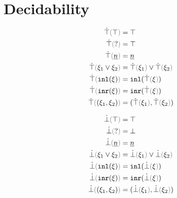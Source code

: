 \section{Decidability}

\judgboxa{\ctruify{\hxi} = \xi}{}
\begin{subequations}\label{defn:truify}
\begin{align}
  \ctruify{\ctruth} &= \ctruth \\
  \ctruify{\cunknown} &= \ctruth \\
  \ctruify{\cnum{n}} &= \cnum{n} \\
  \ctruify{\cor{\xi_1}{\xi_2}} &= \cor{\ctruify{\xi_1}}{\ctruify{\xi_2}} \\
  \ctruify{\cinl{\xi}} &= \cinl{\ctruify{\xi}} \\
  \ctruify{\cinr{\xi}} &= \cinr{\ctruify{\xi}} \\
  \ctruify{\cpair{\xi_1}{\xi_2}} &= \cpair{\ctruify{\xi_1}}{\ctruify{\xi_2}}
\end{align}
\end{subequations}

\judgboxa{\cfalsify{\hxi} = \xi}{}
\begin{subequations}\label{defn:falsify}
\begin{align}
  \cfalsify{\ctruth} &= \ctruth \\
  \cfalsify{\cunknown} &= \cfalsity \\
  \cfalsify{\cnum{n}} &= \cnum{n} \\
  \cfalsify{\cor{\xi_1}{\xi_2}} &= \cor{\cfalsify{\xi_1}}{\cfalsify{\xi_2}} \\
  \cfalsify{\cinl{\xi}} &= \cinl{\cfalsify{\xi}} \\
  \cfalsify{\cinr{\xi}} &= \cinr{\cfalsify{\xi}} \\
  \cfalsify{\cpair{\xi_1}{\xi_2}} &= \cpair{\cfalsify{\xi_1}}{\cfalsify{\xi_2}}
\end{align}
\end{subequations}

